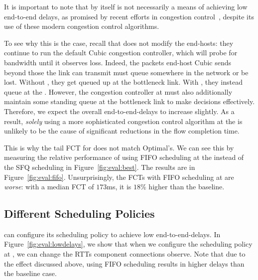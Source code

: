  It is important to note that \name by itself is not necessarily a means of achieving low end-to-end delays, as promised by recent efforts in congestion control~\cite{copa, nimbus}, despite its use of these modern congestion control algorithms.

To see why this is the case, recall that \name does not modify the end-hosts: they continue to run the default Cubic congestion controller, which will probe for bandwidth until it observes loss.
Indeed, the packets end-host Cubic sends beyond those the link can transmit must queue somewhere in the network or be lost. Without \name, they get queued up at the bottleneck link.
With \name, they instead queue at the \inbox.
However, the congestion controller at \inbox must also additionally maintain some standing queue at the bottleneck link to make decisions effectively.
Therefore, we expect the overall end-to-end-delays to increase slightly.
As a result, \emph{solely} using a more sophisticated congestion control algorithm at the \name is unlikely to be the cause of significant reductions in the flow completion time.

This is why the tail FCT for \name does not match Optimal's.
We can see this by measuring the relative performance of using FIFO scheduling at the \name instead of the SFQ scheduling in Figure~\ref{fig:eval:best}.
The results are in Figure~\ref{fig:eval:fifo}. 
Unsurprisingly, the FCTs with FIFO scheduling at \name are \emph{worse}: with a median FCT of $173$ms, it is $18$\% higher than the baseline. 


\subsection{Different Scheduling Policies}\label{s:eval:policies}


\name can configure its scheduling policy to achieve low end-to-end-delays.
In Figure~\ref{fig:eval:lowdelays}, we show that when we configure the scheduling policy at \inbox, we can change the RTTs component connections observe.
Note that due to the effect discussed above, using FIFO scheduling results in higher delays than the baseline case.

